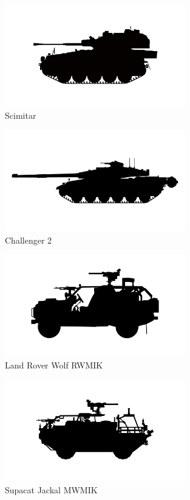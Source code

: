 \begin{figure}[h]
  \centering
  \includegraphics[width=0.7\textwidth]{platforms/scimitar.pdf}
  \caption*{Scimitar}
\end{figure}

\begin{figure}[h]
  \centering
  \includegraphics[width=0.7\textwidth]{platforms/challenger.pdf}
  \caption*{Challenger 2}
\end{figure}

\begin{figure}[h]
  \centering
  \includegraphics[width=0.7\textwidth]{platforms/wmik.pdf}
  \caption*{Land Rover Wolf RWMIK}
\end{figure}

\begin{figure}[h]
  \centering
  \includegraphics[width=0.7\textwidth]{platforms/jackal.pdf}
  \caption*{Supacat Jackal MWMIK}
\end{figure}


